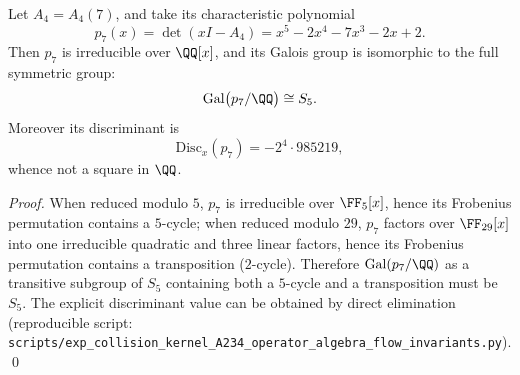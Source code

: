 \begin{proposition}\label{prop:pom-a4-galois-s5}
Let \(A_4=A_4(7)\), and take its characteristic polynomial
\[
p_7(x)=\det(xI-A_4)=x^5-2x^4-7x^3-2x+2.
\]
Then \(p_7\) is irreducible over \(\QQ[x]\), and its Galois group is isomorphic to the full symmetric group:
\[
\mathrm{Gal}\bigl(p_7/\QQ\bigr)\cong S_5.
\]
Moreover its discriminant is
\[
\mathrm{Disc}_x(p_7)=-2^4\cdot 985219,
\]
whence not a square in \(\QQ\).
\end{proposition}
\begin{proof}
When reduced modulo \(5\), \(p_7\) is irreducible over \(\FF_5[x]\), hence its Frobenius permutation contains a \(5\)-cycle; when reduced modulo \(29\), \(p_7\) factors over \(\FF_{29}[x]\) into one irreducible quadratic and three linear factors, hence its Frobenius permutation contains a transposition (\(2\)-cycle).
Therefore \(\mathrm{Gal}(p_7/\QQ)\) as a transitive subgroup of \(S_5\) containing both a \(5\)-cycle and a transposition must be \(S_5\).
The explicit discriminant value can be obtained by direct elimination (reproducible script: \texttt{scripts/exp\_collision\_kernel\_A234\_operator\_algebra\_flow\_invariants.py}). \qed
\end{proof}




